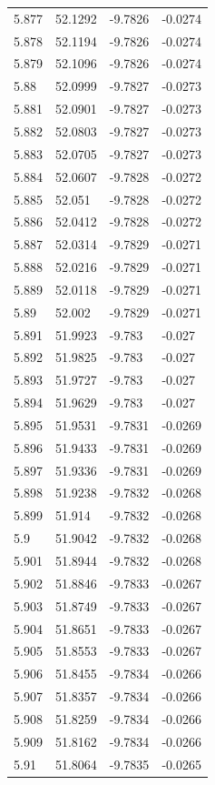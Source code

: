 \begin{tabular}{llll}
5.877 & 52.1292 & -9.7826 & -0.0274 \\
5.878 & 52.1194 & -9.7826 & -0.0274 \\
5.879 & 52.1096 & -9.7826 & -0.0274 \\
5.88 & 52.0999 & -9.7827 & -0.0273 \\
5.881 & 52.0901 & -9.7827 & -0.0273 \\
5.882 & 52.0803 & -9.7827 & -0.0273 \\
5.883 & 52.0705 & -9.7827 & -0.0273 \\
5.884 & 52.0607 & -9.7828 & -0.0272 \\
5.885 & 52.051 & -9.7828 & -0.0272 \\
5.886 & 52.0412 & -9.7828 & -0.0272 \\
5.887 & 52.0314 & -9.7829 & -0.0271 \\
5.888 & 52.0216 & -9.7829 & -0.0271 \\
5.889 & 52.0118 & -9.7829 & -0.0271 \\
5.89 & 52.002 & -9.7829 & -0.0271 \\
5.891 & 51.9923 & -9.783 & -0.027 \\
5.892 & 51.9825 & -9.783 & -0.027 \\
5.893 & 51.9727 & -9.783 & -0.027 \\
5.894 & 51.9629 & -9.783 & -0.027 \\
5.895 & 51.9531 & -9.7831 & -0.0269 \\
5.896 & 51.9433 & -9.7831 & -0.0269 \\
5.897 & 51.9336 & -9.7831 & -0.0269 \\
5.898 & 51.9238 & -9.7832 & -0.0268 \\
5.899 & 51.914 & -9.7832 & -0.0268 \\
5.9 & 51.9042 & -9.7832 & -0.0268 \\
5.901 & 51.8944 & -9.7832 & -0.0268 \\
5.902 & 51.8846 & -9.7833 & -0.0267 \\
5.903 & 51.8749 & -9.7833 & -0.0267 \\
5.904 & 51.8651 & -9.7833 & -0.0267 \\
5.905 & 51.8553 & -9.7833 & -0.0267 \\
5.906 & 51.8455 & -9.7834 & -0.0266 \\
5.907 & 51.8357 & -9.7834 & -0.0266 \\
5.908 & 51.8259 & -9.7834 & -0.0266 \\
5.909 & 51.8162 & -9.7834 & -0.0266 \\
5.91 & 51.8064 & -9.7835 & -0.0265 \\

\end{tabular}
